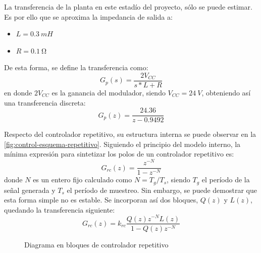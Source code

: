 \documentclass[../et.tex]{subfiles}
\begin{document}
  La transferencia de la planta en este estadío del proyecto, sólo se puede estimar. Es por ello que se aproxima la impedancia de salida a:
      \begin{itemize}
          \item $L = \SI{0.3}{mH}$
          \item $R = \SI{0.1}{\ohm}$
      \end{itemize}
  De esta forma, se define la transferencia como:
  \[
      G_p(s) = \frac{2V_{CC}}{s*L + R}
  \]
  en donde $2V_{CC}$ es la ganancia del modulador, siendo $V_{CC} = \SI{24}{V}$, obteniendo así una transferencia discreta:
  \[
      G_p(z) = \frac{24.36}{z - 0.9492}
  \]

  Respecto del controlador repetitivo, su estructura interna se puede observar en la \autoref{fig:control-esquema-repetitivo}. Siguiendo el principio del modelo interno, la mínima expresión para sintetizar los polos de un controlador repetitivo es:
  \[
      G_{rc}(z) = \frac{z^{-N}}{1-z^{-N}}
  \]
  donde $N$ es un entero fijo calculado como $N = T_g/T_s$, siendo $T_g$ el período de la señal generada y $T_s$ el período de muestreo. Sin embargo, se puede demostrar que esta forma simple no es estable. Se incorporan así dos bloques, $Q(z)$ y $L(z)$, quedando la transferencia siguiente:
  \[
      G_{rc}(z) = k_{rc} \frac{Q(z) z^{-N} L(z)}{1-Q(z) z^{-N}}
  \]

  \begin{figure}[!htbp]
    \centering
    \caption{Diagrama en bloques de controlador repetitivo}
    \label{fig:control-esquema-repetitivo}
  \end{figure}
\end{document}
